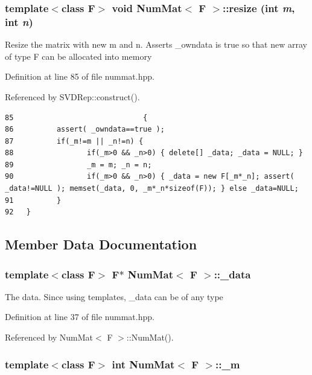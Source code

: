 \subsubsection{\setlength{\rightskip}{0pt plus 5cm}template$<$class F$>$ void {\bf Num\-Mat}$<$ F $>$::resize (int {\em m}, int {\em n})\hspace{0.3cm}{\tt  [inline]}}\label{classNumMat_2ebfd442ba48ad3dfe61b1c0fc370599_2ebfd442ba48ad3dfe61b1c0fc370599}


Resize the matrix with new m and n. Asserts \_\-owndata is true so that new array of type F can be allocated into memory 

Definition at line 85 of file nummat.hpp.

Referenced by SVDRep::construct().

\footnotesize\begin{verbatim}85                              {
86          assert( _owndata==true );
87          if(_m!=m || _n!=n) {
88                 if(_m>0 && _n>0) { delete[] _data; _data = NULL; } 
89                 _m = m; _n = n;
90                 if(_m>0 && _n>0) { _data = new F[_m*_n]; assert( _data!=NULL ); memset(_data, 0, _m*_n*sizeof(F)); } else _data=NULL;
91          }
92   }
\end{verbatim}\normalsize 




\subsection{Member Data Documentation}
\subsubsection{\setlength{\rightskip}{0pt plus 5cm}template$<$class F$>$ F$\ast$ {\bf Num\-Mat}$<$ F $>$::{\bf \_\-data}}\label{classNumMat_7125153abbcb2e949a1b4f81cbe22af5_7125153abbcb2e949a1b4f81cbe22af5}


The data. Since using templates, \_\-data can be of any type 

Definition at line 37 of file nummat.hpp.

Referenced by Num\-Mat$<$ F $>$::Num\-Mat().
\subsubsection{\setlength{\rightskip}{0pt plus 5cm}template$<$class F$>$ int {\bf Num\-Mat}$<$ F $>$::{\bf \_\-m}}\label{classNumMat_b781ae81625400d76d94420d3af2c230_b781ae81625400d76d94420d3af2c230}


